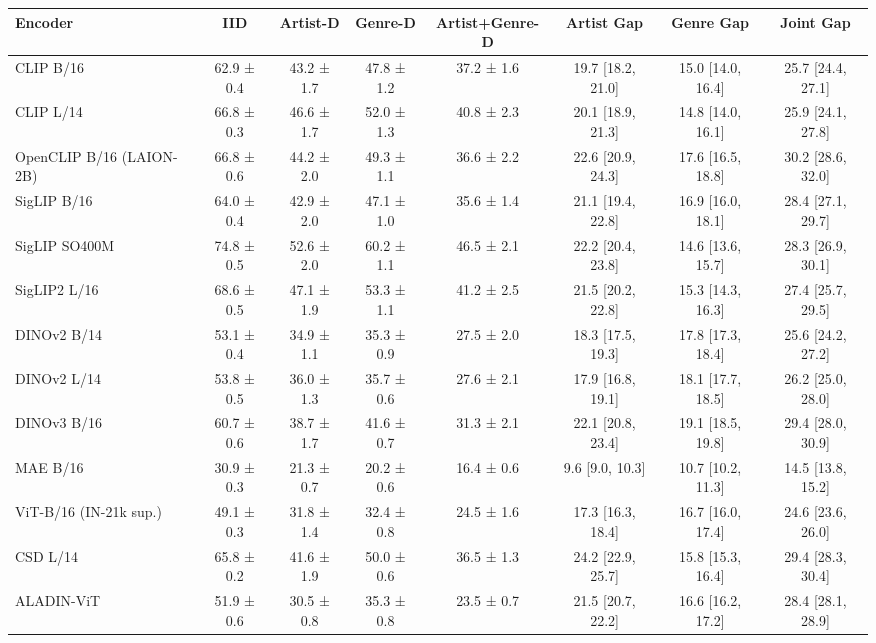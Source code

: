 \begin{tabular}{lccccccc}
\toprule
Encoder & IID & Artist-D & Genre-D & Artist+Genre-D & Artist Gap & Genre Gap & Joint Gap \\
\midrule
CLIP B/16 & 62.9 ± 0.4 & 43.2 ± 1.7 & 47.8 ± 1.2 & 37.2 ± 1.6 & 19.7 [18.2, 21.0] & 15.0 [14.0, 16.4] & 25.7 [24.4, 27.1] \\
CLIP L/14 & 66.8 ± 0.3 & 46.6 ± 1.7 & 52.0 ± 1.3 & 40.8 ± 2.3 & 20.1 [18.9, 21.3] & 14.8 [14.0, 16.1] & 25.9 [24.1, 27.8] \\
OpenCLIP B/16 (LAION-2B) & 66.8 ± 0.6 & 44.2 ± 2.0 & 49.3 ± 1.1 & 36.6 ± 2.2 & 22.6 [20.9, 24.3] & 17.6 [16.5, 18.8] & 30.2 [28.6, 32.0] \\
SigLIP B/16 & 64.0 ± 0.4 & 42.9 ± 2.0 & 47.1 ± 1.0 & 35.6 ± 1.4 & 21.1 [19.4, 22.8] & 16.9 [16.0, 18.1] & 28.4 [27.1, 29.7] \\
SigLIP SO400M & 74.8 ± 0.5 & 52.6 ± 2.0 & 60.2 ± 1.1 & 46.5 ± 2.1 & 22.2 [20.4, 23.8] & 14.6 [13.6, 15.7] & 28.3 [26.9, 30.1] \\
SigLIP2 L/16 & 68.6 ± 0.5 & 47.1 ± 1.9 & 53.3 ± 1.1 & 41.2 ± 2.5 & 21.5 [20.2, 22.8] & 15.3 [14.3, 16.3] & 27.4 [25.7, 29.5] \\
DINOv2 B/14 & 53.1 ± 0.4 & 34.9 ± 1.1 & 35.3 ± 0.9 & 27.5 ± 2.0 & 18.3 [17.5, 19.3] & 17.8 [17.3, 18.4] & 25.6 [24.2, 27.2] \\
DINOv2 L/14 & 53.8 ± 0.5 & 36.0 ± 1.3 & 35.7 ± 0.6 & 27.6 ± 2.1 & 17.9 [16.8, 19.1] & 18.1 [17.7, 18.5] & 26.2 [25.0, 28.0] \\
DINOv3 B/16 & 60.7 ± 0.6 & 38.7 ± 1.7 & 41.6 ± 0.7 & 31.3 ± 2.1 & 22.1 [20.8, 23.4] & 19.1 [18.5, 19.8] & 29.4 [28.0, 30.9] \\
MAE B/16 & 30.9 ± 0.3 & 21.3 ± 0.7 & 20.2 ± 0.6 & 16.4 ± 0.6 & 9.6 [9.0, 10.3] & 10.7 [10.2, 11.3] & 14.5 [13.8, 15.2] \\
ViT-B/16 (IN-21k sup.) & 49.1 ± 0.3 & 31.8 ± 1.4 & 32.4 ± 0.8 & 24.5 ± 1.6 & 17.3 [16.3, 18.4] & 16.7 [16.0, 17.4] & 24.6 [23.6, 26.0] \\
CSD L/14 & 65.8 ± 0.2 & 41.6 ± 1.9 & 50.0 ± 0.6 & 36.5 ± 1.3 & 24.2 [22.9, 25.7] & 15.8 [15.3, 16.4] & 29.4 [28.3, 30.4] \\
ALADIN-ViT & 51.9 ± 0.6 & 30.5 ± 0.8 & 35.3 ± 0.8 & 23.5 ± 0.7 & 21.5 [20.7, 22.2] & 16.6 [16.2, 17.2] & 28.4 [28.1, 28.9] \\
\bottomrule
\end{tabular}
